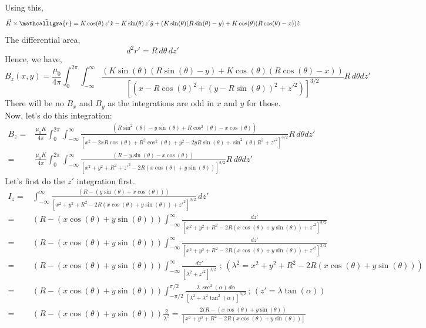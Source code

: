 \documentclass{article}
\newcommand{\scriptr}{\mathord{\mathcalligra{r}}}
\begin{document}
Using this, 
\begin{equation*}
    \vec{K}\times \vec{\scriptr} = K \cos(\theta)\, z' \hat{x} - K \sin(\theta)\, z' \hat{y} + (K\sin(\theta)(R\sin(\theta)-y)+K\cos(\theta)(R\cos(\theta)-x))\hat{z}
\end{equation*}
The differential area,
\begin{equation*}
    d^2r' = R\, d\theta \, dz'
\end{equation*}
Hence, we have,
\begin{equation}
    B_z(x,y) = \frac{\mu_0}{4\pi}\int_{0}^{2\pi}\int_{-\infty}^{\infty}\frac{(K\sin(\theta)(R\sin(\theta)-y)+K\cos(\theta)(R\cos(\theta)-x))}{[(x-R\cos(\theta)^2+(y-R\sin(\theta))^2+ z'^2)]^{3/2}}R\, d\theta dz'
\end{equation}
There will be no $B_x$ and $B_y$ as the integrations are odd in $x$ and $y$ for those. Now, let's do this integration:
\begin{equation}
    \begin{split}
    B_z =& \frac{\mu_0K}{4\pi}\int_{0}^{2\pi}\int_{-\infty}^{\infty}\frac{(R\sin^2(\theta)-y\sin(\theta)+R\cos^2(\theta)-x\cos(\theta))}{[x^2-2xR\cos(\theta)+R^2\cos^2(\theta)+y^2-2yR\sin(\theta)+\sin^2(\theta)R^2+z'^2]^{3/2}}R\, d\theta dz'\\
    =& \frac{\mu_0K}{4\pi}\int_{0}^{2\pi}\int_{-\infty}^{\infty}\frac{(R-y\sin(\theta)-x\cos(\theta))}{[x^2+y^2+R^2+z'^2-2R(x\cos(\theta)+y\sin(\theta))]^{3/2}}R\, d\theta dz'
    \end{split}
\end{equation}
Let's first do the $z'$ integration first.
\begin{equation*}
    \begin{split}
        I_z =& \int_{-\infty}^{\infty}\frac{(R-(y\sin(\theta)+x\cos(\theta)))}{[x^2+y^2+R^2-2R(x\cos(\theta)+y\sin(\theta))+z'^2]^{3/2}}\, dz'\\
        =& (R-(x\cos(\theta)+y\sin(\theta)))\int_{-\infty}^{\infty}\frac{dz'}{[x^2+y^2+R^2-2R(x\cos(\theta)+y\sin(\theta))+z'^2]^{3/2}}\\
        =& (R-(x\cos(\theta)+y\sin(\theta)))\int_{-\infty}^{\infty}\frac{dz'}{[x^2+y^2+R^2-2R(x\cos(\theta)+y\sin(\theta))+z'^2]^{3/2}}\\
        =& (R-(x\cos(\theta)+y\sin(\theta)))\int_{-\infty}^{\infty}\frac{dz'}{[\lambda^2+z'^2]^{3/2}} \, \, ; \,(\lambda^2=x^2+y^2+R^2-2R(x\cos(\theta)+y\sin(\theta)))\\
        =& (R-(x\cos(\theta)+y\sin(\theta)))\int_{-\pi/2}^{\pi/2}\frac{\lambda\, \sec^2(\alpha)\, d\alpha}{[\lambda^2+\lambda^2 \tan^2(\alpha)]^{3/2}}\, ; \, (z'=\lambda \tan(\alpha))\\
        =& (R-(x\cos(\theta)+y\sin(\theta)))\frac{2}{\lambda^2} = \frac{2 (R-(x\cos(\theta)+y\sin(\theta))}{[x^2+y^2+R^2-2R(x\cos(\theta)+y\sin(\theta))]}
    \end{split}
\end{equation*}
\end{document}
